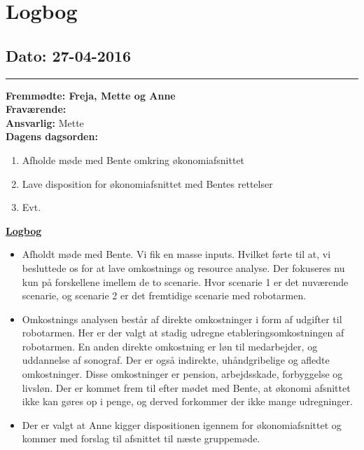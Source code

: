 \chapter{Logbog}
\section{Dato: 27-04-2016}
\hrule
\textbf{Fremmødte: Freja, Mette og Anne} \\
\textbf{Fraværende: } \\
\textbf{Ansvarlig: }Mette \\
\textbf{Dagens dagsorden: }
\begin{enumerate}
	\item Afholde møde med Bente omkring økonomiafsnittet
	\item Lave disposition for økonomiafsnittet med Bentes rettelser
	\item Evt. 
\end{enumerate}

\underline{\textbf{Logbog}}
\begin{itemize}
\item Afholdt møde med Bente. Vi fik en masse inputs. Hvilket førte til at, vi besluttede os for at lave omkostnings og resource analyse. Der fokuseres nu kun på forskellene imellem de to scenarie. Hvor scenarie 1 er det nuværende scenarie, og scenarie 2 er det fremtidige scenarie med robotarmen.
\item Omkostnings analysen består af direkte omkostninger i form af udgifter til robotarmen. Her er der valgt at stadig udregne etableringsomkostningen af robotarmen. En anden direkte omkostning er løn til medarbejder, og uddannelse af sonograf. Der er også indirekte, uhåndgribelige og afledte omkostninger. Disse omkostninger er pension, arbejdsskade, forbyggelse og livsløn. Der er kommet frem til efter mødet med Bente, at økonomi afsnittet ikke kan gøres op i penge, og derved forkommer der ikke mange udregninger. 
\item Der er valgt at Anne kigger dispositionen igennem for økonomiafsnittet og kommer med forslag til afsnittet til næste gruppemøde. \\

\end{itemize}
